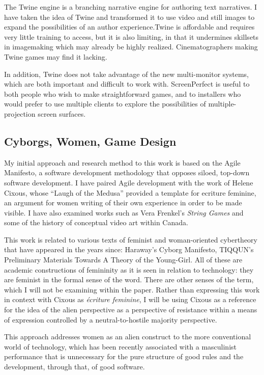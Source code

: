 The Twine engine is a branching narrative engine for authoring text narratives. I have taken the idea of Twine and transformed it to use video and still images to expand the possibilities of an author experience.Twine is affordable and requires very little training to access, but it is also limiting, in that it undermines skillsets in imagemaking which may already be highly realized. Cinematographers making Twine games may find it lacking.

In addition, Twine does not take advantage of the new multi-monitor systems, which are both important and difficult to work with. ScreenPerfect is useful to both people who wish to make straightforward games, and to installers who would prefer to use multiple clients to explore the possibilities of multiple-projection screen surfaces.

\subsection{Cyborgs, Women, Game Design}

My initial approach and research method to this work is based on the Agile Manifesto, a software development methodology that opposes siloed, top-down software development. I have paired Agile development with the work of Helene Cixous, whose “Laugh of the Medusa” provided a template for ecriture feminine, an argument for women writing of their own experience in order to be made visible. I have also examined works such as Vera Frenkel's \textit{String Games} and some of the history of conceptual video art within Canada. 

This work is related to various texts of feminist and woman-oriented cybertheory that have appeared in the years since: Haraway’s Cyborg Manifesto, TIQQUN’s Preliminary Materials Towards A Theory of the Young-Girl. All of these are academic constructions of femininity as it is seen in relation to technology: they are feminist in the formal sense of the word. There are other senses of the term, which I will not be examining within the paper. Rather than expressing this work in context with Cixous as \textit{écriture feminine}, I will be using Cixous as a reference for the idea of the alien perspective as a perspective of resistance within a means of expression controlled by a neutral-to-hostile majority perspective. 

This approach addresses women as an alien construct to the more conventional world of technology, which has been recently associated with a masculinist performance that is unnecessary for the pure structure of good rules and the development, through that, of good software. 

